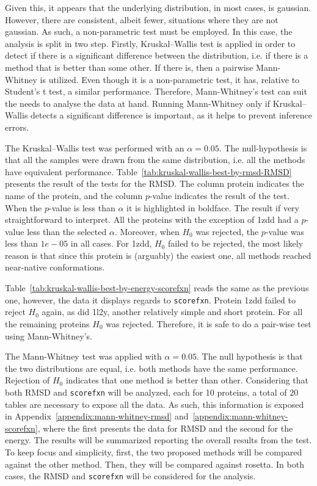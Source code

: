 Given this, it appears that the underlying distribution, in most cases, is
gaussian. However, there are consistent, albeit fewer, situations where they are
not gaussian. As such, a non-parametric test must be employed. In this case, the
analysis is split in two step. Firstly, Kruskal–Wallis test is applied in order
to detect if there is a significant difference between the distribution, i.e.
if there is a method that is better than some other. If there is, then
a pairwise Mann-Whitney is utilized. Even though it is a non-parametric test, it
has, relative to Student's t test, a similar performance. Therefore,
Mann-Whitney's test can suit the needs to analyse the data at hand. Running
Mann-Whitney only if Kruskal–Wallis detects a significant difference is
important, as it helps to prevent inference errors.

The Kruskal–Wallis test was performed with an $\alpha = 0.05$. The null-hypothesis
is that all the samples were drawn from the same distribution, i.e. all the
methods have equivalent performance.
Table~\ref{tab:kruskal-wallis-best-by-rmsd-RMSD} presents the result of the
tests for the RMSD.
The column protein indicates the name of the protein, and the column
$p$-value indicates the result of the test. When the $p$-value is less than
$\alpha$ it is highlighted in boldface. The result if very straightforward to
interpret. All the proteins with the exception of 1zdd had a $p$-value less
than the selected $\alpha$. Moreover, when $H_0$ was rejected, the $p$-value
was less than $1e-05$ in all cases. For 1zdd, $H_0$ failed to be rejected, the
most likely reason is that since this protein is (arguably) the easiest one,
all methods reached near-native conformations.

Table~\ref{tab:kruskal-wallis-best-by-energy-scorefxn} reads the same
as the previous one, however, the data it displays regards to \texttt{scorefxn}.
Protein 1zdd failed to reject $H_0$ again, as did 1l2y, another relatively
simple and short protein. For all the remaining proteins $H_0$ was rejected.
Therefore, it is safe to do a pair-wise test using Mann-Whitney's.



The Mann-Whitney test was applied with $\alpha = 0.05$. The null hypothesis is
that the two distributions are equal, i.e. both methods have the same
performance. Rejection of $H_0$ indicates that one method is better than other.
Considering that both RMSD and \texttt{scorefxn} will be analyzed, each for
10 proteins, a total of $20$ tables are necessary to expose all the data. As
such, this information is exposed in Appendix~\ref{appendix:mann-whitney-rmsd}
and~\ref{appendix:mann-whitney-scorefxn}, where the first presents the data for
RMSD and the second for the energy. The results will be summarized reporting the
overall results from the test. To keep focus and simplicity, first, the two
proposed methods will be compared against the other method. Then, they will be
compared against rosetta. In both cases, the RMSD and \texttt{scorefxn} will be
considered for the analysis.

